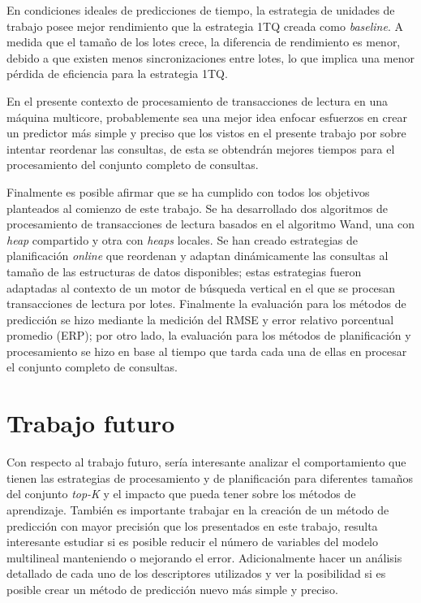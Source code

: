 En condiciones ideales de predicciones de tiempo, la estrategia de unidades de trabajo posee mejor rendimiento que la estrategia 1TQ creada como \textit{baseline}. A medida que el tamaño de los lotes crece, la diferencia de rendimiento es menor, debido a que existen menos sincronizaciones entre lotes, lo que implica una menor pérdida de eficiencia para la estrategia 1TQ.

En el presente contexto de procesamiento de transacciones de lectura en una máquina multicore, probablemente sea una mejor idea enfocar esfuerzos en crear un predictor más simple y preciso que los vistos en el presente trabajo por sobre intentar reordenar las consultas, de esta se obtendrán mejores tiempos para el procesamiento del conjunto completo de consultas.

Finalmente es posible afirmar que se ha cumplido con todos los objetivos planteados al comienzo de este trabajo. Se ha desarrollado dos algoritmos de procesamiento de transacciones de lectura basados en el algoritmo Wand, una con \textit{heap} compartido y otra con \textit{heaps} locales. Se han creado estrategias de planificación \textit{online} que reordenan y adaptan dinámicamente las consultas al tamaño de las estructuras de datos disponibles; estas estrategias fueron adaptadas al contexto de un motor de búsqueda vertical en el que se procesan transacciones de lectura por lotes. Finalmente la evaluación para los métodos de predicción se hizo mediante la medición del RMSE y error relativo porcentual promedio (ERP); por otro lado, la evaluación para los métodos de planificación y procesamiento se hizo en base al tiempo que tarda cada una de ellas en procesar el conjunto completo de consultas.

\section{Trabajo futuro}
\label{conclu:trabajofuturo}
Con respecto al trabajo futuro, sería interesante analizar el comportamiento que tienen las estrategias de procesamiento y de planificación para diferentes tamaños del conjunto \textit{top-K} y el impacto que pueda tener sobre los métodos de aprendizaje.
También es importante trabajar en la creación de un método de predicción con mayor precisión que los presentados en este trabajo, resulta interesante estudiar si es posible reducir el número de variables del modelo multilineal manteniendo o mejorando el error. Adicionalmente hacer un análisis detallado de cada uno de los descriptores utilizados y ver la posibilidad si es posible crear un método de predicción nuevo más simple y preciso. 
